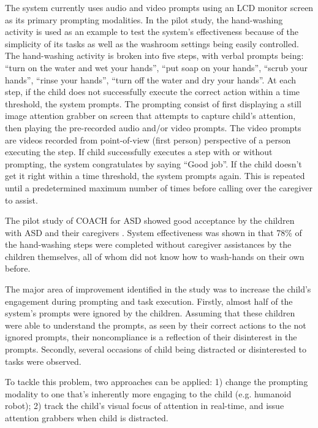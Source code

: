 The system currently uses audio and video prompts using an LCD monitor screen as its primary prompting modalities.  In the pilot study, the hand-washing activity is used as an example to test the system's effectiveness because of the simplicity of its tasks as well as the washroom settings being easily controlled.  The hand-washing activity is broken into five steps, with verbal prompts being: ``turn on the water and wet your hands'', ``put soap on your hands'', ``scrub your hands'', ``rinse your hands'', ``turn off the water and dry your hands''.  At each step, if the child does not successfully execute the correct action within a time threshold, the system prompts.  The prompting consist of first displaying a still image attention grabber on screen that attempts to capture child's attention, then playing the pre-recorded audio and/or video prompts.  The video prompts are videos recorded from point-of-view (first person) perspective of a person executing the step.  If child successfully executes a step with or without prompting, the system congratulates by saying ``Good job''.  If the child doesn't get it right within a time threshold, the system prompts again.  This is repeated until a predetermined maximum number of times before calling over the caregiver to assist.  


The pilot study of COACH for ASD showed good acceptance by the children with ASD and their caregivers \cite{bimbrahw2012investigating}.  System effectiveness was shown in that 78\% of the hand-washing steps were completed without caregiver assistances by the children themselves, all of whom did not know how to wash-hands on their own before.


The major area of improvement identified in the study was to increase the child's engagement during prompting and task execution.  Firstly, almost half of the system's prompts were ignored by the children.  Assuming that these children were able to understand the prompts, as seen by their correct actions to the not ignored prompts, their noncompliance is a reflection of their disinterest in the prompts.  Secondly, several occasions of child being distracted or disinterested to tasks were observed.


To tackle this problem, two approaches can be applied: 1) change the prompting modality to one that's inherently more engaging to the child (e.g. humanoid robot); 2) track the child's visual focus of attention in real-time, and issue attention grabbers when child is distracted.
